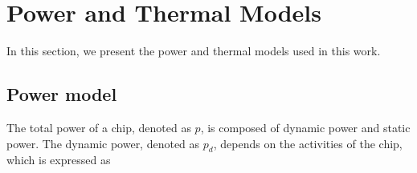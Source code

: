 \section{Power and Thermal Models}\label{sec:power_therm_model}

In this section, we present the power and thermal models used in this work. 

\subsection{Power model}\label{sec:power_model}

The total power of a chip, denoted as $p$, is composed of dynamic power and static power. The dynamic power, denoted as $p_d$, depends on the activities of the chip, which is expressed as



